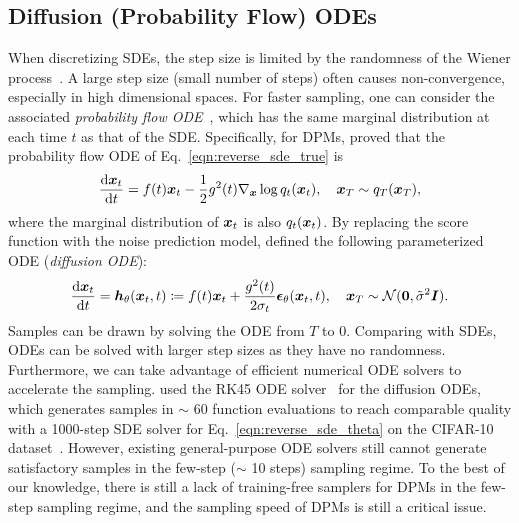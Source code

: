 \subsection{Diffusion (Probability Flow) ODEs}
\label{sec:bg_ode}
When discretizing SDEs, the step size is limited by the randomness of the Wiener process~\citep[Chap. 11]{kloeden1992Numerical}. A large step size (small number of steps) often causes non-convergence, especially in high dimensional spaces. 
For faster sampling, one can consider the 
associated \textit{probability flow ODE}~\citep{song2020score}, which has the same marginal distribution at each time $t$ as that of the SDE. 
Specifically, for DPMs, \citet{song2020score} proved that the probability flow ODE of Eq.~\eqref{eqn:reverse_sde_true} is
\begin{equation}
    \frac{\mathrm{d}\bm{x}_t}{\mathrm{d}t} = f(t)\bm{x}_t - \frac{1}{2}g^2(t)\nabla_{\bm{x}}\log q_t(\bm{x}_t), \quad \bm{x}_T\sim q_T(\bm{x}_T),
\end{equation}
where the marginal distribution of $\bm{x}_t$ is also $q_t(\bm{x}_t)$. By replacing the score function with the noise prediction model, \citet{song2020score} defined the following parameterized ODE (\textit{diffusion ODE}):
\begin{equation}
\label{eqn:diffusion_ode}
    \frac{\mathrm{d}\bm{x}_t}{\mathrm{d}t} = \bm{h}_\theta(\bm{x}_t,t)\coloneqq f(t)\bm{x}_t + \frac{g^2(t)}{2\sigma_t}\bm{\epsilon}_\theta(\bm{x}_t,t), \quad \bm{x}_T\sim \mathcal{N}(\bm{0},\tilde\sigma^2\bm{I}).
\end{equation}
Samples can be drawn by solving the ODE from $T$ to $0$.
Comparing with SDEs, ODEs can be solved with larger step sizes as they have no randomness. Furthermore, we can take advantage of efficient numerical ODE solvers to accelerate the sampling. 
\citet{song2020score} used the RK45 ODE solver~\citep{dormand1980family}  for the diffusion ODEs, which generates samples in $\sim$ 60 function evaluations to reach comparable quality with a 1000-step SDE solver for Eq.~\eqref{eqn:reverse_sde_theta} on the CIFAR-10 dataset~\citep{Krizhevsky09learningmultiple}. However, existing general-purpose ODE solvers still cannot generate satisfactory samples in the few-step ($\sim$ 10 steps) sampling regime. To the best of our knowledge, there is still a lack of training-free samplers for DPMs in the few-step sampling regime, and the sampling speed of DPMs is still a critical issue. 



